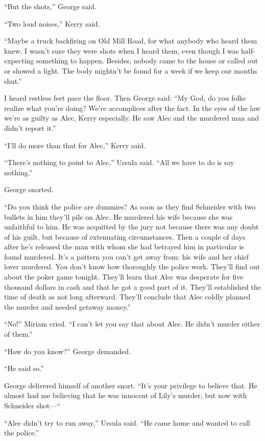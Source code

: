 \documentclass{novel}
\begin{document}
“But the shots,” George said.

“Two loud noises,” Kerry said.

“Maybe a truck backfiring on Old Mill Road, for what anybody who heard them knew. I wasn’t sure they were shots when I heard them, even though I was half-expecting something to happen. Besides, nobody came to the house or called out or showed a light. The body mightn’t be found for a week if we keep our mouths shut.”

I heard restless feet pace the floor. Then George said: “My God, do you folks realize what you’re doing? We’re accomplices after the fact. In the eyes of the law we’re as guilty as Alec, Kerry especially. He saw Alec and the murdered man and didn’t report it.”

“I’ll do more than that for Alec,” Kerry said.

“There’s nothing to point to Alec,” Ursula said. “All we have to do is say nothing.”

George snorted. 

“Do you think the police are dummies? As soon as they find Schneider with two bullets in him they’ll pile on Alec. He murdered his wife because she was unfaithful to him. He was acquitted by the jury not because there was any doubt of his guilt, but because of extenuating circumstances. Then a couple of days after he’s released the man with whom she had betrayed him in particular is found murdered. It’s a pattern you can’t get away from: his wife and her chief lover murdered. You don’t know how thoroughly the police work. They’ll find out about the poker game tonight. They’ll learn that Alec was desperate for five thousand dollars in cash and that he got a good part of it. They’ll established the time of death as not long afterward. They’ll conclude that Alec coldly planned the murder and needed getaway money.”

“No!” Miriam cried. “I can’t let you say that about Alec. He didn’t murder either of them.”

“How do you know?” George demanded.

“He said so.”

\scenestars

George delivered himself of another snort. “It’s your privilege to believe that. He almost had me believing that he was innocent of Lily’s murder, but now with Schneider shot—“

“Alec didn’t try to run away,” Ursula said. “He came home and wanted to call the police.”
\end{document}
